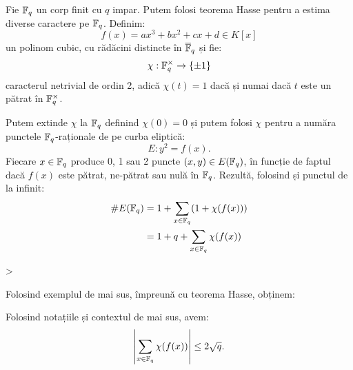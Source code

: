 \begin{example}\label{exm:eliptic-fq}
    Fie $ \mathbb{F}_q $ un corp finit cu $ q $ impar. Putem folosi teorema Hasse pentru a estima
    diverse caractere pe $ \mathbb{F}_q $. Definim:
    \[
        f(x) = ax^3 + bx^2 + cx + d \in K[x]
    \]
    un polinom cubic, cu rădăcini distincte în $ \overline{\mathbb{F}}_q $ și fie:
    \[
        \chi : \mathbb{F}_q^\times \to \{ \pm 1 \}
    \]
    caracterul netrivial de ordin 2, adică $ \chi(t) = 1 $ dacă și numai dacă
    $ t $ este un pătrat în $ \mathbb{F}_q^\times $.

    Putem extinde $ \chi $ la $ \mathbb{F}_q $ definind $ \chi(0) = 0 $ și putem folosi
    $ \chi $ pentru a număra punctele $ \mathbb{F}_q $-raționale de pe curba eliptică:
    \[
        E : y^2 = f(x).
    \]
    Fiecare $ x \in \mathbb{F}_q $ produce 0, 1 sau 2 puncte $ (x, y) \in E(\mathbb{F}_q) $, în
    funcție de faptul dacă $ f(x) $ este pătrat, ne-pătrat sau nulă în $ \mathbb{F}_q $.
    Rezultă, folosind și punctul de la infinit:
    \begin{align*}
        \# E(\mathbb{F}_q) &= 1 + \sum_{x \in \mathbb{F}_q} (1 + \chi(f(x))) \\
                    &= 1 + q + \sum_{x \in \mathbb{F}_q} \chi(f(x))
    \end{align*}
\end{example}>

Folosind exemplul de mai sus, împreună cu teorema Hasse, obținem:
\begin{corollary}\label{cor:hass-char}
    Folosind notațiile și contextul de mai sus, avem:
    \[
        \left| \sum_{x \in \mathbb{F}_q} \chi(f(x)) \right| \leq 2 \sqrt{q}.
    \]
\end{corollary}


